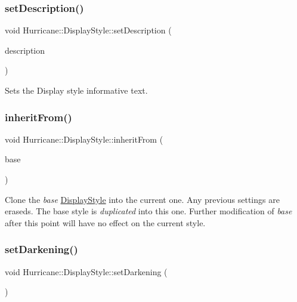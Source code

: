 \subsubsection{\texorpdfstring{set\+Description()}{setDescription()}}
{\footnotesize\ttfamily void Hurricane\+::\+Display\+Style\+::set\+Description (\begin{DoxyParamCaption}\item[{const std\+::string \&}]{description }\end{DoxyParamCaption})\hspace{0.3cm}{\ttfamily [inline]}}

Sets the Display style informative text. \mbox{\label{classHurricane_1_1DisplayStyle_a603dbd5d6973a8897a85513acdfda2d0}} 
\subsubsection{\texorpdfstring{inherit\+From()}{inheritFrom()}}
{\footnotesize\ttfamily void Hurricane\+::\+Display\+Style\+::inherit\+From (\begin{DoxyParamCaption}\item[{const \mbox{\hyperlink{classHurricane_1_1DisplayStyle}{Display\+Style}} $\ast$}]{base }\end{DoxyParamCaption})}

Clone the {\itshape base} \mbox{\hyperlink{classHurricane_1_1DisplayStyle}{Display\+Style}} into the current one. Any previous settings are eraseds. The base style is {\itshape duplicated} into this one. Further modification of {\itshape base} after this point will have no effect on the current style. \mbox{\label{classHurricane_1_1DisplayStyle_ab17b746af2c529c62a902d0cb992be34}} 
\subsubsection{\texorpdfstring{set\+Darkening()}{setDarkening()}}
{\footnotesize\ttfamily void Hurricane\+::\+Display\+Style\+::set\+Darkening (\begin{DoxyParamCaption}\item[{const H\+S\+Vr \&}]{ }\end{DoxyParamCaption})}


